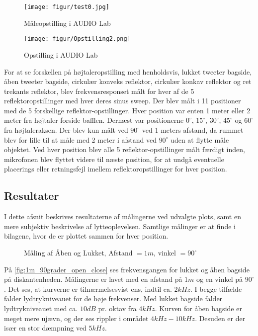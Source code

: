 \begin{figure}[H] 
	\begin{center}
		\texttt{[image: figur/test0.jpg]}\quad
		\caption{Måleopstilling i AUDIO Lab}
		\label{fig:opstilling1}
	\end{center}
\end{figure}

\begin{figure}[H] 
	\begin{center}
		\texttt{[image: figur/Opstilling2.png]}\quad
		\caption{Opstilling i AUDIO Lab}
		\label{fig:opstilling2}
	\end{center}
\end{figure}

For at se forskellen på højtaleropstilling med henholdsvis, lukket tweeter bagside, åben tweeter bagside, cirkulær konveks reflektor, cirkulær konkav reflektor og ret trekants reflektor, blev frekvensresponset målt for hver af de 5 reflektoropstillinger med hver deres sinus sweep. Der blev målt i 11 positioner med de 5 forskellige reflektor-opstillinger. Hver position var enten 1 meter eller 2 meter fra højtaler forside bafflen.  Dernæst var positionerne $0^{\circ}$, $15 ^{\circ}$, $30 ^{\circ}$, $ 45 ^{\circ}$ og $ 60 ^{\circ} $ fra højtaleraksen. Der blev kun målt ved $90 ^{\circ}$ ved 1 meters afstand, da rummet blev for lille til at måle med 2 meter i afstand ved $90 ^{\circ}$ uden at flytte måle objektet. Ved hver position blev alle 5 reflektor-opstillinger målt færdigt inden, mikrofonen blev flyttet videre til næste position, for at undgå eventuelle placerings eller retningsfejl imellem reflektoropstillinger for hver position.

\subsection{Resultater}
I dette afsnit beskrives resultaterne af målingerne ved udvalgte plots, samt en mere subjektiv beskrivelse af lytteoplevelsen. 
Samtlige målinger er at finde i bilagene, hvor de er plottet sammen for hver position. 
\begin{figure}[H]
    \caption{Måling af Åben og Lukket, Afstand $= 1m$, vinkel $= 90 ^{\circ}$ }
    \label{fig:1m_90grader_open_close}
\end{figure}

På \autoref{fig:1m_90grader_open_close} ses frekvensgangen for lukket og åben bagside på diskantenheden.
Målingerne er lavet med en afstand på $1m$ og en vinkel på $90 ^{\circ}$.
Det ses, at kurverne er tilnærmelsesvist ens, indtil ca. $2 kHz$.
I begge tilfælde falder lydtrykniveauet for de høje frekvenser. 
Med lukket bagside falder lydtrykniveauet med ca. $ 10 dB $  pr. oktav fra $4 kHz$.
Kurven for åben bagside er meget mere ujævn, og der ses rippler i området $4kHz - 10 kHz$.
Desuden er der især en stor dæmpning ved $5 kHz$.

